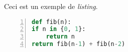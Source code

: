 \documentclass[a4paper]{article}
\begin{document}
Ceci est un exemple de {\em listing}.\\

\begin{lstlisting}[language=Python, numbers=left, frame=single]
def fib(n):
if n in {0, 1}:
    return n
return fib(n-1) + fib(n-2)
\end{lstlisting}

% 
\end{document}
